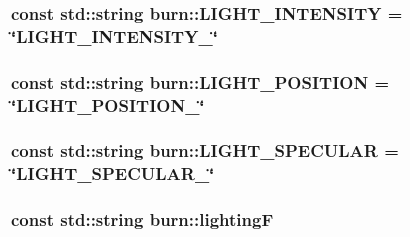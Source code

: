 \hypertarget{namespaceburn_aca7df8a95e5540d26da673ad43c639af}{
\subsubsection[{L\-I\-G\-H\-T\-\_\-\-I\-N\-T\-E\-N\-S\-I\-T\-Y}]{\setlength{\rightskip}{0pt plus 5cm}const std\-::string burn\-::\-L\-I\-G\-H\-T\-\_\-\-I\-N\-T\-E\-N\-S\-I\-T\-Y = \char`\"{}L\-I\-G\-H\-T\-\_\-\-I\-N\-T\-E\-N\-S\-I\-T\-Y\-\_\-\char`\"{}}}\label{namespaceburn_aca7df8a95e5540d26da673ad43c639af}
\hypertarget{namespaceburn_a6512046548178a3d2212bfbca815c5b0}{
\subsubsection[{L\-I\-G\-H\-T\-\_\-\-P\-O\-S\-I\-T\-I\-O\-N}]{\setlength{\rightskip}{0pt plus 5cm}const std\-::string burn\-::\-L\-I\-G\-H\-T\-\_\-\-P\-O\-S\-I\-T\-I\-O\-N = \char`\"{}L\-I\-G\-H\-T\-\_\-\-P\-O\-S\-I\-T\-I\-O\-N\-\_\-\char`\"{}}}\label{namespaceburn_a6512046548178a3d2212bfbca815c5b0}
\hypertarget{namespaceburn_a4a1c8f51e081e667c4a08ab9251a8b61}{
\subsubsection[{L\-I\-G\-H\-T\-\_\-\-S\-P\-E\-C\-U\-L\-A\-R}]{\setlength{\rightskip}{0pt plus 5cm}const std\-::string burn\-::\-L\-I\-G\-H\-T\-\_\-\-S\-P\-E\-C\-U\-L\-A\-R = \char`\"{}L\-I\-G\-H\-T\-\_\-\-S\-P\-E\-C\-U\-L\-A\-R\-\_\-\char`\"{}}}\label{namespaceburn_a4a1c8f51e081e667c4a08ab9251a8b61}
\hypertarget{namespaceburn_a01739beb4fb70b50d2f18f0f2ca82b62}{
\subsubsection[{lighting\-F}]{\setlength{\rightskip}{0pt plus 5cm}const std\-::string burn\-::lighting\-F}}\label{namespaceburn_a01739beb4fb70b50d2f18f0f2ca82b62}
